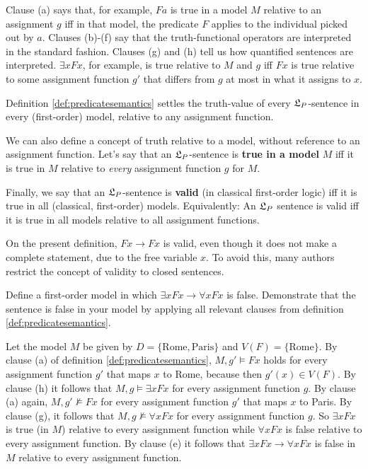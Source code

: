 Clause (a) says that, for example, $Fa$ is true in a model $M$ relative to an
assignment $g$ iff in that model, the predicate $F$ applies to the individual
picked out by $a$. Clauses (b)-(f) say that the truth-functional operators are
interpreted in the standard fashion. Clauses (g) and (h) tell us how quantified
sentences are interpreted. $\exists x Fx$, for example, is true relative to $M$
and $g$ iff $Fx$ is true relative to some assignment function $g'$ that differs
from $g$ at most in what it assigns to $x$.

Definition \ref{def:predicatesemantics} settles the truth-value of every
$\mathfrak{L}_P$-sentence in every (first-order) model, relative to any assignment
function.

We can also define a concept of truth relative to a model, without reference to
an assignment function. Let's say that an $\mathfrak{L}_P$-sentence is \textbf{true in a
  model} $M$ iff it is true in $M$ relative to \emph{every} assignment function
$g$ for $M$.

Finally, we say that an $\mathfrak{L}_P$-sentence is \textbf{valid} (in classical
first-order logic) iff it is true in all (classical, first-order)
models. Equivalently: An $\mathfrak{L}_P$ sentence is valid iff it is true in all models
relative to all assignment functions.

On the present definition, $Fx \to Fx$ is valid, even though it does not make a
complete statement, due to the free variable $x$. To avoid this, many authors
restrict the concept of validity to closed sentences.


\begin{exercise}
  Define a first-order model in which $\exists x Fx \to \forall x Fx$ is
  false. Demonstrate that the sentence is false in your model by applying all
  relevant clauses from definition \ref{def:predicatesemantics}.
\end{exercise}
\begin{solution}
  Let the model $M$ be given by $D = \{ \text{Rome}, \text{Paris} \}$ and
  $V(F) = \{ \text{Rome} \}$. By clause (a) of definition
  \ref{def:predicatesemantics}, $M,g' \models Fx$ holds for every assignment
  function $g'$ that maps $x$ to Rome, because then $g'(x) \in V(F)$. By clause
  (h) it follows that $M,g \models \exists x Fx$ for every assignment function
  $g$. By clause (a) again, $M, g' \not\models Fx$ for every assignment function
  $g'$ that maps $x$ to Paris. By clause (g), it follows that
  $M,g \not\models \forall x Fx$ for every assignment function $g$. So
  $\exists x Fx$ is true (in $M$) relative to every assignment function while
  $\forall x Fx$ is false relative to every assignment function. By clause (e)
  it follows that $\exists x Fx \to \forall x Fx$ is false in $M$ relative to
  every assignment function.
\end{solution}

